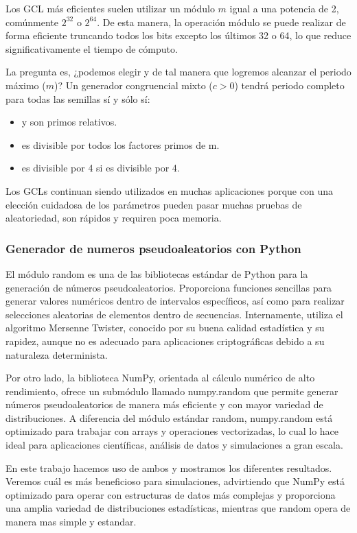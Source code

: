 \documentclass{article}
\begin{document}
Los GCL más eficientes suelen utilizar un módulo \( m \) igual a una potencia de 2, comúnmente \( 2^{32} \) o \( 2^{64} \). De esta manera, la operación módulo se puede realizar de forma eficiente truncando todos los bits excepto los últimos 32 o 64, lo que reduce significativamente el tiempo de cómputo.


La pregunta es, ¿podemos elegir y de tal manera que logremos alcanzar el periodo máximo (\( m \))? Un
generador congruencial mixto ($c>0$) tendrá periodo completo para todas las semillas sí y sólo sí:

\begin{itemize}
    \item y son primos relativos.
    \item es divisible por todos los factores primos de m.
    \item es divisible por 4 si es divisible por 4.
\end{itemize}

Los GCLs continuan siendo utilizados en muchas aplicaciones porque con una elección cuidadosa de los parámetros pueden pasar muchas pruebas de aleatoriedad, son rápidos y requiren poca memoria.
\subsubsection{Generador de numeros pseudoaleatorios con Python}

El módulo random es una de las bibliotecas estándar de Python para la generación de números pseudoaleatorios. Proporciona funciones sencillas para generar valores numéricos dentro de intervalos específicos, así como para realizar selecciones aleatorias de elementos dentro de secuencias. Internamente, utiliza el algoritmo Mersenne Twister, conocido por su buena calidad estadística y su rapidez, aunque no es adecuado para aplicaciones criptográficas debido a su naturaleza determinista.

Por otro lado, la biblioteca NumPy, orientada al cálculo numérico de alto rendimiento, ofrece un submódulo llamado numpy.random que permite generar números pseudoaleatorios de manera más eficiente y con mayor variedad de distribuciones. A diferencia del módulo estándar random, numpy.random está optimizado para trabajar con arrays y operaciones vectorizadas, lo cual lo hace ideal para aplicaciones científicas, análisis de datos y simulaciones a gran escala.

En este trabajo hacemos uso de ambos y mostramos los diferentes resultados. Veremos cuál es más beneficioso para simulaciones, advirtiendo que NumPy está optimizado para operar con estructuras de datos más complejas y proporciona una amplia variedad de distribuciones estadísticas, mientras que random opera de manera mas simple y estandar.
      
\end{document}

